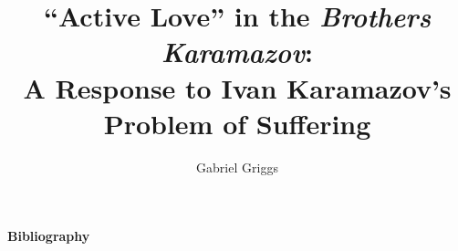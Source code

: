 \documentclass[12pt]{report}
\begin{document}
    
       \graduationmonth{}
       \graduationyear{}
       \author{Gabriel Griggs}
       \committee{}{}{}{}{}
       \title{``Active Love'' in the \emph{Brothers Karamazov}: \\ A Response to Ivan Karamazov's Problem of Suffering}



          \titlepage


\begin{acknowledgements}

     

\end{acknowledgements}

\pagebreak
\begingroup
\renewcommand{\section}[2]{}	%
\centerline{\textbf{Bibliography}} 
\end{document}
